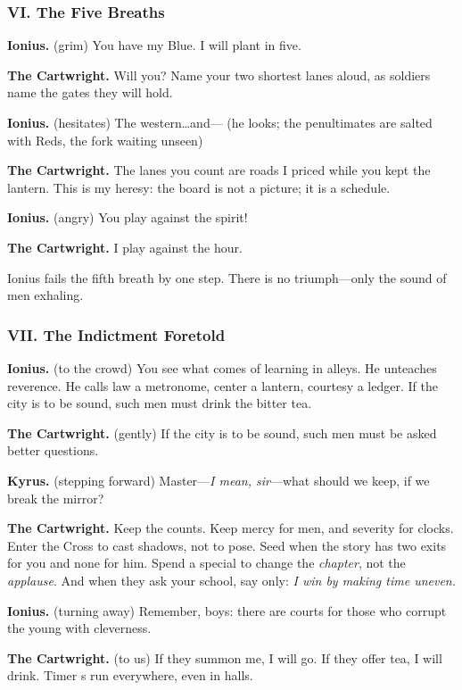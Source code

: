 \documentclass[11pt]{article}
\begin{document}
\medskip
\subsubsection*{VI. The Five Breaths}
\noindent\textbf{Ionius.} (grim) You have my Blue. I will plant in five.

\noindent\textbf{The Cartwright.} Will you? Name your two shortest lanes aloud, as soldiers name the gates they will hold.

\noindent\textbf{Ionius.} (hesitates) The western\dots and--- (he looks; the penultimates are salted with Reds, the fork waiting unseen)

\noindent\textbf{The Cartwright.} The lanes you count are roads I priced while you kept the lantern. This is my heresy: the board is not a picture; it is a schedule.

\noindent\textbf{Ionius.} (angry) You play against the spirit!

\noindent\textbf{The Cartwright.} I play against the hour.

Ionius fails the fifth breath by one step. There is no triumph---only the sound of men exhaling.

\medskip
\subsubsection*{VII. The Indictment Foretold}
\noindent\textbf{Ionius.} (to the crowd) You see what comes of learning in alleys. He unteaches reverence. He calls law a metronome, center a lantern, courtesy a ledger. If the city is to be sound, such men must drink the bitter tea.

\noindent\textbf{The Cartwright.} (gently) If the city is to be sound, such men must be asked better questions.

\noindent\textbf{Kyrus.} (stepping forward) Master---\emph{I mean, sir}---what should we keep, if we break the mirror?

\noindent\textbf{The Cartwright.} Keep the counts. Keep mercy for men, and severity for clocks. Enter the Cross to cast shadows, not to pose. Seed when the story has two exits for you and none for him. Spend a special to change the \emph{chapter}, not the \emph{applause}. And when they ask your school, say only: \emph{I win by making time uneven.}

\noindent\textbf{Ionius.} (turning away) Remember, boys: there are courts for those who corrupt the young with cleverness.

\noindent\textbf{The Cartwright.} (to us) If they summon me, I will go. If they offer tea, I will drink. Timer s run everywhere, even in halls.
\end{document}
